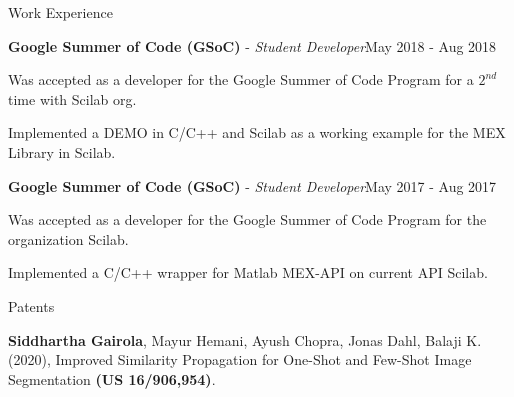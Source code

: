 \documentclass{resume} %
\begin{document}
\begin{rSection}{Work Experience}
\begin{rSubsection}{\textbf{Google Summer of Code (GSoC)} - \textit{Student Developer}}{May 2018 - Aug 2018}{}{}
\item Was accepted as a developer for the Google Summer of Code Program for a $2^{nd}$ time with Scilab org.
\item Implemented a DEMO in C/C++ and Scilab as a working example for the MEX Library in Scilab.
\end{rSubsection}

\begin{rSubsection}{\textbf{Google Summer of Code (GSoC)} - \textit{Student Developer}}{May 2017 - Aug 2017}{}{}
\item Was accepted as a developer for the Google Summer of Code Program for the organization Scilab.
\item Implemented a C/C++ wrapper for Matlab MEX-API on current API Scilab.
\end{rSubsection}

\end{rSection}


\begin{rSection}{Patents}
\begin{rSubsection}{\large \underline{\textbf{}} }{}{}{}
 \item \textbf{Siddhartha Gairola}, Mayur Hemani, Ayush Chopra, Jonas Dahl, Balaji K. (2020), Improved Similarity Propagation for One-Shot and Few-Shot Image Segmentation \textbf{(US 16/906,954)}.
\end{rSubsection}
\end{rSection}
\end{document}
